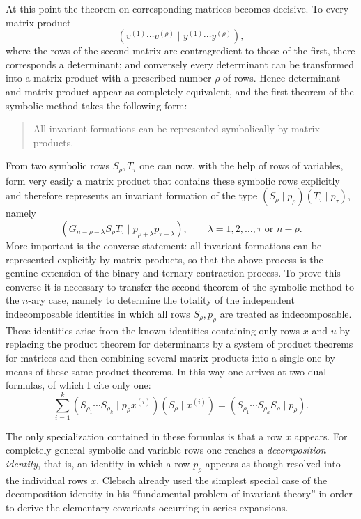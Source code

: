 \documentclass[11pt]{article}
\begin{document}
At this point the theorem on corresponding matrices becomes decisive. To every matrix product
\[
(v^{(1)}\cdots v^{(\rho)} \mid y^{(1)}\cdots y^{(\rho)}),
\]
where the rows of the second matrix are contragredient to those of the first, there corresponds a determinant; and conversely every determinant can be transformed into a matrix product with a prescribed number $\rho$ of rows. Hence determinant and matrix product appear as completely equivalent, and the first theorem of the symbolic method takes the following form:

\begin{quote}
All invariant formations can be represented symbolically by matrix products.
\end{quote}

From two symbolic rows $S_\rho,T_\tau$ one can now, with the help of rows of variables, form very easily a matrix product that contains these symbolic rows explicitly and therefore represents an invariant formation of the type $(S_\rho\mid p_\rho)(T_\tau\mid p_\tau)$, namely
\[
(G_{n-\rho-\lambda}S_\rho T_\tau \mid p_{\rho+\lambda}p_{\tau-\lambda}),
\qquad
\lambda = 1,2,\dots,\tau \text{ or } n-\rho.
\tag{1}
\]
More important is the converse statement: all invariant formations can be represented explicitly by matrix products, so that the above process is the genuine extension of the binary and ternary contraction process. To prove this converse it is necessary to transfer the second theorem of the symbolic method to the $n$-ary case, namely to determine the totality of the independent indecomposable identities in which all rows $S_\rho,p_\rho$ are treated as indecomposable. These identities arise from the known identities containing only rows $x$ and $u$ by replacing the product theorem for determinants by a system of product theorems for matrices and then combining several matrix products into a single one by means of these same product theorems. In this way one arrives at two dual formulas, of which I cite only one:
\[
\sum_{i=1}^{k} (S_{\rho_1}\cdots S_{\rho_k}\mid p_\rho x^{(i)})(S_\rho\mid x^{(i)})
=
(S_{\rho_1}\cdots S_{\rho_k}S_\rho\mid p_\rho).
\tag{2}
\]

The only specialization contained in these formulas is that a row $x$ appears. For completely general symbolic and variable rows one reaches a \emph{decomposition identity}, that is, an identity in which a row $p_\rho$ appears as though resolved into the individual rows $x$. Clebsch already used the simplest special case of the decomposition identity in his ``fundamental problem of invariant theory'' in order to derive the elementary covariants occurring in series expansions.
\end{document}
